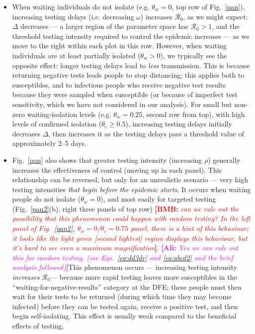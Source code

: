 \documentclass[12pt]{article}
\newcommand{\fref}[1]{Fig.~\ref{#1}}
\newcommand{\Rnum}{\ensuremath{\mathcal{R}_0}\xspace}
\DeclareRobustCommand\_{\ifmmode\expandafter\subtxt\else\textunderscore\fi}
\newcommand{\comment}{\showcomment}
\newcommand{\showcomment}[3]{\textcolor{#1}{\textbf{[#2: }\textsl{#3}\textbf{]}}}
\newcommand{\ali}[1]{\comment{magenta}{Ali}{#1}}
\newcommand{\bmb}[1]{\comment{red}{BMB}{#1}}
\theoremstyle{definition} %
\begin{document}
\begin{itemize}
\item When waiting individuals do not isolate (e.g. $\theta_w =0$, top row of \fref{pan}), increasing testing delays (i.e. decreasing $\omega$) increases \Rnum, as we might expect: $\Delta$ decreases --- a larger region of the parameter space has $\Rnum>1$, and the threshold testing intensity required to control the epidemic increases --- as we move to the right within each plot in this row. However, when waiting individuals are at least partially isolated ($\theta_w>0$), we typically see the opposite effect: longer testing delays lead to \emph{less} transmission. This is because returning negative tests leads people to stop distancing; this applies both to susceptibles, and to infectious people who receive negative test results because they were sampled when susceptible (or because of imperfect test sensitivity, which we have not considered in our analysis). For small but non-zero waiting-isolation levels (e.g. $\theta_w=0.25$, second row from top), with high levels of confirmed isolation ($\theta_c \ge 0.5$), increasing testing delays initially decreases $\Delta$, then increases it as the testing delays pass a threshold value of approximately 2--5 days.
\item \fref{pan} also shows that greater testing intensity (increasing $\rho$) generally increases the effectiveness of control (moving up in each panel). This relationship can be reversed, but only for an unrealistic scenario --- very high testing intensities \emph{that begin before the epidemic starts}. It occurs when waiting people do not isolate ($\theta_w=0$), and most easily for targeted testing (\fref{pan2}(b), right three panels of top row) \bmb{can we rule out the possibility that this phenomenon could happen with random testing? In the left panel of \fref{pan2}, $\theta_w=0$/$\theta_c=0.75$ panel, there is a hint of this behaviour; it looks like the light green [second lightest] region displays this behaviour, but it's hard to see even a maximum magnification}. \ali{Yes we can rule out this for random testing, (see Eqs.~\ref{eq:dd3dr} and \ref{eq:abcd2} and the brief analysis followed)}This phenomenon occurs --- increasing testing intensity \emph{increases} \Rnum --- because more rapid testing leaves more susceptibles in the ``waiting-for-negative-results'' category at the DFE; these people must then wait for their tests to be returned (during which time they may become infected) before they can be tested again, receive a positive test, and then begin self-isolating. This effect is usually weak compared to the beneficial effects of testing.

\end{itemize}
\end{document}
